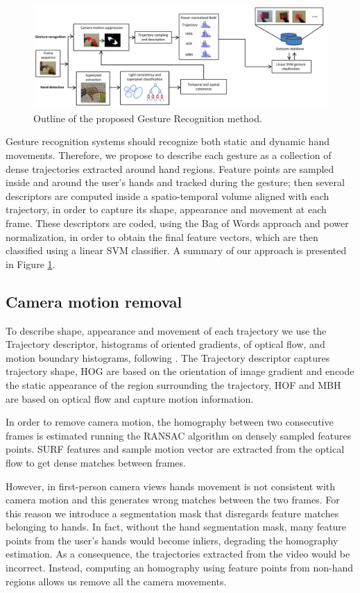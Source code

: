 \begin{figure}
\centering
\includegraphics[width=\linewidth]{Figures/schema.pdf}
\caption{Outline of the proposed Gesture Recognition method.}
\label{schema}
\end{figure}
Gesture recognition systems should recognize both static and dynamic hand movements. Therefore, we propose to describe each gesture as a collection of dense trajectories extracted around hand regions. Feature points are sampled inside and around the user's hands and tracked during the gesture; then several descriptors are computed inside a spatio-temporal volume aligned with each trajectory, in order to capture its shape, appearance and movement at each frame. 
These descriptors are coded,  using the Bag of Words approach and power normalization, in order to obtain the final feature vectors, which are then classified using a linear SVM classifier. A summary of our approach is presented in Figure \ref{schema}.

\subsection{Camera motion removal}
To describe shape, appearance and movement of each trajectory we use the Trajectory descriptor, histograms of oriented gradients, of optical flow, and motion boundary histograms, following \cite{wang:2011:inria-00583818:1}. The Trajectory descriptor captures trajectory shape, HOG are based on the orientation of image gradient and encode the static appearance of the region surrounding the trajectory, HOF and MBH are based on optical flow and capture motion information.

In order to remove camera motion, the homography between two consecutive frames is estimated running the RANSAC algorithm on densely sampled features points. SURF features and sample motion vector are extracted from the optical flow to get dense matches between frames. 

However, in first-person camera views hands movement is not consistent with camera motion and this generates wrong matches between the two frames. For this reason we introduce a segmentation mask that disregards feature matches belonging to hands. In fact, without the hand segmentation mask, many feature points from the user's hands would become inliers, degrading the homography estimation. As a consequence, the trajectories extracted from the video would be incorrect. Instead, computing an homography using feature points from non-hand regions allows us remove all the camera movements.


